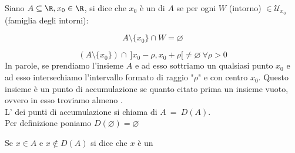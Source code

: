 \documentclass[../analisi.tex]{subfiles}
\begin{document}
\begin{defn}
	Siano $ \acr, x_0 \in \R $, si dice che $x_0$ è un 
	 di $A$ se per ogni $W$ (intorno) $\in 
	\mathcal{U}_{x_0}$ (famiglia degli intorni):
	

	\begin{equation}
		A \setminus \{ x_0 \} \cap W = \varnothing
	\end{equation}
	\bda


	\begin{equation}
		(A \setminus \{ x_0 \} ) \cap\ ] x_0 - \rho, x_0 + \rho [
		\neq \varnothing\ \forall \rho > 0
	\end{equation}
In parole, se prendiamo l'insieme $A$ e ad esso sottriamo un qualsiasi punto $x_0$
e ad esso intersechiamo l'intervallo formato di raggio 
 "$\rho$" e con centro $x_0$. 
Questo insieme è un punto di accumulazione se quanto citato prima
 un insieme vuoto, ovvero in esso troviamo almeno . \\
L' dei punti di accumulazione si chiama  di $A\ =\ D(A)$.\\
Per definizione poniamo $D(\varnothing) = \varnothing$
\end{defn}
\begin{defn}
	Se $ x \in A $ e $ x \notin  D(A)$ si dice che $x$ è un 
\end{defn}
\end{document}
